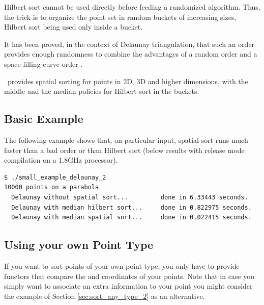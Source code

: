 Hilbert sort cannot be used directly before feeding a randomized algorithm.
Thus, the trick is to organize the point set in random buckets of increasing
sizes, Hilbert sort being used only inside a bucket.

It has been proved, in the context of Delaunay triangulation, that
such an order provides enough randomness to combine the advantages of a random
 order and a space filling curve order \cite{acr-icb-03}.


\cgal\ provides spatial sorting for points in 2D, 3D and higher dimensions,
with the middle and the median policies for Hilbert sort in the buckets.

\subsection{Basic Example}

The following example shows that, on particular input, spatial sort
runs much faster than a bad order or than Hilbert sort (below results
with release mode compilation on a 1.8GHz processor).
\begin{verbatim}
$ ./small_example_delaunay_2 
10000 points on a parabola
  Delaunay without spatial sort...         done in 6.33443 seconds.
  Delaunay with median hilbert sort...     done in 0.822975 seconds.
  Delaunay with median spatial sort...     done in 0.022415 seconds.
\end{verbatim}



\subsection{Using your own Point Type}
If you want to sort points of your own point type,
you only have to provide functors that compare
the  and  coordinates of your points. Note that in case you simply want
to associate an extra information to your point you might consider the example of Section
\ref{sec:sort_any_type_2}
as an alternative.


